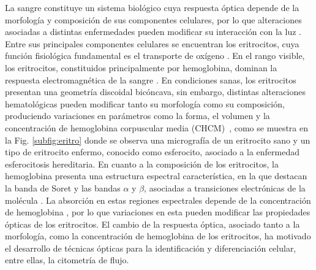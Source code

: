La sangre constituye un sistema biológico cuya respuesta óptica depende de la morfología y composición de sus componentes celulares, por lo que alteraciones asociadas a distintas enfermedades pueden modificar su interacción con la luz \cite{ergulComputationalStudyScattering2010, giengerRefractiveIndexBlood2019}.  Entre sus principales componentes celulares se encuentran los eritrocitos, cuya función fisiológica fundamental es el transporte de oxígeno \cite{palTextbookMedicalPhysiology2021}. En el rango visible, los eritrocitos, constituidos principalmente por hemoglobina,  dominan la respuesta electromagnética de la sangre \cite{bosschaartLiteratureReviewNovel2014}. En condiciones sanas, los eritrocitos presentan una geometría discoidal bicóncava, sin embargo, distintas alteraciones hematológicas pueden modificar tanto su morfología como su composición, produciendo variaciones en parámetros como la forma, el volumen y la concentración de hemoglobina corpuscular media (CHCM)~\cite{palTextbookMedicalPhysiology2021}, como se muestra en la Fig. \ref{subfig:eritro} donde se observa una micrografía de un eritrocito sano y un tipo de eritrocito enfermo, conocido como esferocito, asociado a la enfermedad esferocitosis hereditaria. En cuanto a la composición de los eritrocitos, la hemoglobina presenta una estructura espectral característica, en la que destacan la banda de Soret y las bandas $\alpha$ y $\beta$, asociadas a transiciones electrónicas de la molécula \cite{dayerBandAssignmentHemoglobin2010}. La absorción en estas regiones espectrales depende de la concentración de hemoglobina \cite{friebelModelFunctionCalculate2006}, por lo que variaciones en esta pueden modificar las propiedades ópticas de los eritrocitos. El cambio de la respuesta óptica, asociado tanto a la morfología, como la concentración de hemoglobina de los eritrocitos, ha motivado el desarrollo de técnicas ópticas para la identificación y diferenciación celular, entre ellas, la citometría de flujo. %

